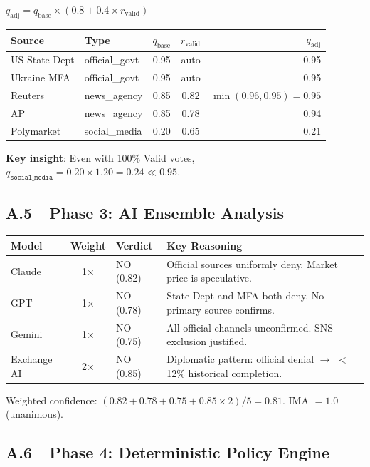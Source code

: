 \documentclass[11pt,a4paper,twocolumn]{article}
\begin{document}
\noindent $q_{\text{adj}} = q_{\text{base}} \times (0.8 + 0.4 \times r_{\text{valid}})$

\medskip
\begin{tabularx}{\textwidth}{@{}Xlccr@{}}
\toprule
\textbf{Source} & \textbf{Type} & $q_{\text{base}}$ & $r_{\text{valid}}$ & $q_{\text{adj}}$ \\
\midrule
US State Dept & official\_govt & 0.95 & auto & 0.95 \\
Ukraine MFA & official\_govt & 0.95 & auto & 0.95 \\
Reuters & news\_agency & 0.85 & 0.82 & $\min(0.96, 0.95) = 0.95$ \\
AP & news\_agency & 0.85 & 0.78 & 0.94 \\
Polymarket & social\_media & 0.20 & 0.65 & 0.21 \\
\bottomrule
\end{tabularx}

\medskip
\noindent\textbf{Key insight}: Even with 100\% Valid votes, $q_{\texttt{social\_media}} = 0.20 \times 1.20 = 0.24 \ll 0.95$.

\subsection*{A.5~~Phase 3: AI Ensemble Analysis}

\begin{tabularx}{\textwidth}{@{}lclX@{}}
\toprule
\textbf{Model} & \textbf{Weight} & \textbf{Verdict} & \textbf{Key Reasoning} \\
\midrule
Claude & 1$\times$ & NO (0.82) & Official sources uniformly deny. Market price is speculative. \\
GPT & 1$\times$ & NO (0.78) & State Dept and MFA both deny. No primary source confirms. \\
Gemini & 1$\times$ & NO (0.75) & All official channels unconfirmed. SNS exclusion justified. \\
Exchange AI & 2$\times$ & NO (0.85) & Diplomatic pattern: official denial $\to$ $<$12\% historical completion. \\
\bottomrule
\end{tabularx}

\medskip
\noindent Weighted confidence: $(0.82 + 0.78 + 0.75 + 0.85 \times 2) / 5 = 0.81$. \quad IMA $= 1.0$ (unanimous).

\subsection*{A.6~~Phase 4: Deterministic Policy Engine}
\end{document}
